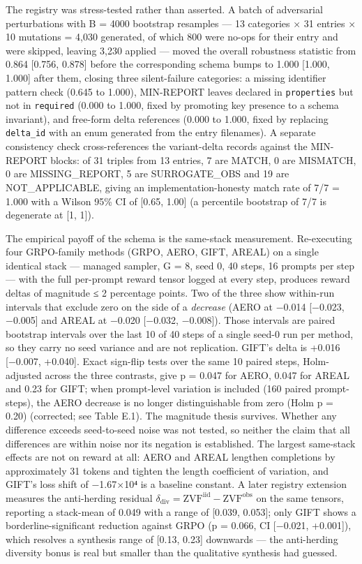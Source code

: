 \documentclass[12pt,a4paper]{report}
\begin{document}
The registry was stress-tested rather than asserted. A batch of
adversarial perturbations with B = 4000 bootstrap resamples --- 13
categories × 31 entries × 10 mutations = 4,030 generated, of which 800
were no-ops for their entry and were skipped, leaving 3,230 applied ---
moved the overall robustness statistic from 0.864 {[}0.756, 0.878{]}
before the corresponding schema bumps to 1.000 {[}1.000, 1.000{]} after
them, closing three silent-failure categories: a missing identifier
pattern check (0.645 to 1.000), MIN-REPORT leaves declared in
\texttt{properties} but not in \texttt{required} (0.000 to 1.000, fixed
by promoting key presence to a schema invariant), and free-form delta
references (0.000 to 1.000, fixed by replacing \texttt{delta\_id} with
an enum generated from the entry filenames). A separate consistency
check cross-references the variant-delta records against the MIN-REPORT
blocks: of 31 triples from 13 entries, 7 are MATCH, 0 are MISMATCH, 0
are MISSING\_REPORT, 5 are SURROGATE\_OBS and 19 are NOT\_APPLICABLE,
giving an implementation-honesty match rate of 7/7 = 1.000 with a Wilson
95\% CI of {[}0.65, 1.00{]} (a percentile bootstrap of 7/7 is degenerate
at {[}1, 1{]}).

The empirical payoff of the schema is the same-stack measurement.
Re-executing four GRPO-family methods (GRPO, AERO, GIFT, AREAL) on a
single identical stack --- managed sampler, G = 8, seed 0, 40 steps, 16
prompts per step --- with the full per-prompt reward tensor logged at
every step, produces reward deltas of magnitude ≤ 2 percentage points.
Two of the three show within-run intervals that exclude zero on the side
of a \emph{decrease} (AERO at −0.014 {[}−0.023, −0.005{]} and AREAL at
−0.020 {[}−0.032, −0.008{]}). Those intervals are paired bootstrap
intervals over the last 10 of 40 steps of a single seed-0 run per
method, so they carry no seed variance and are not replication. GIFT's
delta is +0.016 {[}−0.007, +0.040{]}. Exact sign-flip tests over the
same 10 paired steps, Holm-adjusted across the three contrasts, give p =
0.047 for AERO, 0.047 for AREAL and 0.23 for GIFT; when prompt-level
variation is included (160 paired prompt-steps), the AERO decrease is no
longer distinguishable from zero (Holm p = 0.20) (corrected; see Table
E.1). The magnitude thesis survives. Whether any difference exceeds
seed-to-seed noise was not tested, so neither the claim that all
differences are within noise nor its negation is established. The
largest same-stack effects are not on reward at all: AERO and AREAL
lengthen completions by approximately 31 tokens and tighten the length
coefficient of variation, and GIFT's loss shift of −1.67×10⁴ is a
baseline constant. A later registry extension measures the anti-herding
residual
\(\delta_{\mathrm{div}} = \mathrm{ZVF}^{\mathrm{iid}} - \mathrm{ZVF}^{\mathrm{obs}}\)
on the same tensors, reporting a stack-mean of 0.049 with a range of
{[}0.039, 0.053{]}; only GIFT shows a borderline-significant reduction
against GRPO (p = 0.066, CI {[}−0.021, +0.001{]}), which resolves a
synthesis range of {[}0.13, 0.23{]} downwards --- the anti-herding
diversity bonus is real but smaller than the qualitative synthesis had
guessed.
\end{document}
